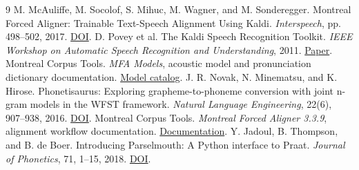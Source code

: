 \documentclass[11pt,a4paper]{article}
\begin{document}
\begingroup
\small
\setlength{\parskip}{0pt}
\begin{thebibliography}{9}
\setlength{\itemsep}{1pt}
 M. McAuliffe, M. Socolof, S. Mihuc, M. Wagner, and M. Sonderegger. Montreal Forced Aligner: Trainable Text-Speech Alignment Using Kaldi. \emph{Interspeech}, pp. 498–502, 2017. \href{https://doi.org/10.21437/Interspeech.2017-1386}{DOI}.
 D. Povey et al. The Kaldi Speech Recognition Toolkit. \emph{IEEE Workshop on Automatic Speech Recognition and Understanding}, 2011. \href{https://publications.idiap.ch/attachments/papers/2012/Povey_ASRU2011_2011.pdf}{Paper}.
 Montreal Corpus Tools. \emph{MFA Models}, acoustic model and pronunciation dictionary documentation. \href{https://mfa-models.readthedocs.io/en/latest/acoustic/index.html}{Model catalog}.
 J. R. Novak, N. Minematsu, and K. Hirose. Phonetisaurus: Exploring grapheme-to-phoneme conversion with joint n-gram models in the WFST framework. \emph{Natural Language Engineering}, 22(6), 907–938, 2016. \href{https://doi.org/10.1017/S1351324915000315}{DOI}.
 Montreal Corpus Tools. \emph{Montreal Forced Aligner 3.3.9}, alignment workflow documentation. \href{https://montreal-forced-aligner.readthedocs.io/en/v3.3.9/user_guide/workflows/alignment.html}{Documentation}.
 Y. Jadoul, B. Thompson, and B. de Boer. Introducing Parselmouth: A Python interface to Praat. \emph{Journal of Phonetics}, 71, 1–15, 2018. \href{https://doi.org/10.1016/j.wocn.2018.07.001}{DOI}.
\end{thebibliography}
\endgroup
\end{document}
